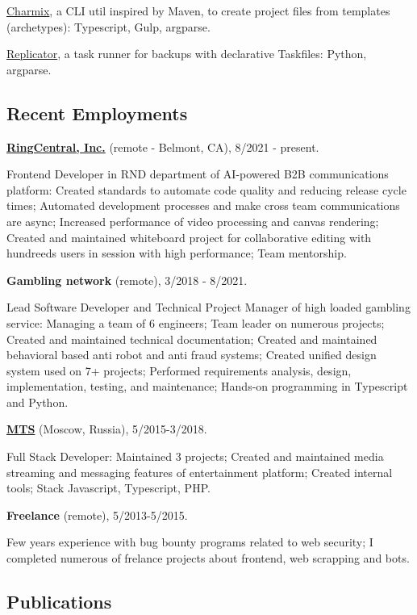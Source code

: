 \documentclass{vitonsky}
\begin{document}
\href{https://github.com/vitonsky/charmix}{Charmix}, a CLI util inspired
by Maven, to create project files from templates (archetypes):
Typescript, Gulp, argparse.

\href{https://github.com/vitonsky/replicator}{Replicator}, a task runner
for backups with declarative Taskfiles: Python, argparse.

\subsection*{Recent Employments}

\textbf{\href{https://www.ringcentral.com/}{RingCentral, Inc.}} (remote - Belmont, CA), 8/2021 - present.

Frontend Developer in RND department of AI-powered B2B communications platform: Created standards to automate code quality and reducing release cycle times; Automated development processes and make cross team communications are async; Increased performance of video processing and canvas rendering; Created and maintained whiteboard project for collaborative editing with hundreeds users in session with high performance; Team mentorship.

\textbf{Gambling network} (remote), 3/2018 - 8/2021.

Lead Software Developer and Technical Project Manager of high loaded gambling service: Managing a team of 6 engineers; Team leader on numerous projects; Created and maintained technical documentation; Created and maintained behavioral based anti robot and anti fraud systems; Created unified design system used on 7+ projects; Performed requirements analysis, design, implementation, testing, and maintenance; Hands-on programming in Typescript and Python.

\textbf{\href{https://mts.ru}{MTS}} (Moscow, Russia), 5/2015-3/2018.

Full Stack Developer: Maintained 3 projects; Created and maintained media streaming and messaging features of entertainment platform; Created internal tools; Stack Javascript, Typescript, PHP.

\textbf{Freelance} (remote), 5/2013-5/2015.

Few years experience with bug bounty programs related to web security; I completed numerous of frelance projects about frontend, web scrapping and bots.

\subsection*{Publications}
\end{document}
